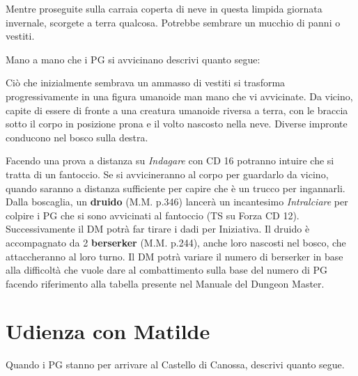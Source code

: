 \documentclass[letterpaper,twocolumn,openany,nodeprecatedcode]{dndbook}
\begin{document}
\begin{DndReadAloud}
Mentre proseguite sulla carraia coperta di neve in questa limpida giornata invernale, scorgete a terra qualcosa. Potrebbe sembrare un mucchio di panni o vestiti.
\end{DndReadAloud}

Mano a mano che i PG si avvicinano descrivi quanto segue:

\begin{DndReadAloud}
Ciò che inizialmente sembrava un ammasso di vestiti si trasforma progressivamente in una figura umanoide man mano che vi avvicinate. Da vicino, capite di essere di fronte a una creatura umanoide riversa a terra, con le braccia sotto il corpo in posizione prona e il volto nascosto nella neve. Diverse impronte conducono nel bosco sulla destra.
\end{DndReadAloud}

Facendo una prova a distanza su \textit{Indagare} con CD 16 potranno intuire che si tratta di un fantoccio. Se si avvicineranno al corpo per guardarlo da vicino, quando saranno a distanza sufficiente per capire che è un trucco per ingannarli. Dalla boscaglia, un \textbf{druido} (M.M. p.346) lancerà un incantesimo \textit{Intralciare} per colpire i PG che si sono avvicinati al fantoccio (TS su Forza CD 12). Successivamente il DM potrà far tirare i dadi per Iniziativa. Il druido è accompagnato da 2 \textbf{berserker} (M.M. p.244), anche loro nascosti nel bosco, che attaccheranno al loro turno. Il DM potrà variare il numero di berserker in base alla difficoltà che vuole dare al combattimento sulla base del numero di PG facendo riferimento alla tabella presente nel Manuale del Dungeon Master\cite{dnd:dm}.







\section{Udienza con Matilde}
Quando i PG stanno per arrivare al Castello di Canossa, descrivi quanto segue.
\end{document}
